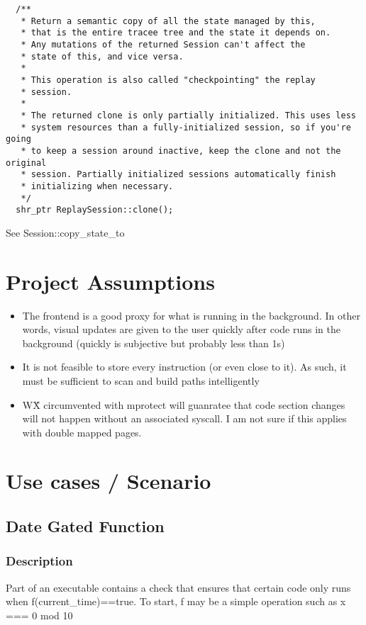 \begin{verbatim}
  /**
   * Return a semantic copy of all the state managed by this,
   * that is the entire tracee tree and the state it depends on.
   * Any mutations of the returned Session can't affect the
   * state of this, and vice versa.
   *
   * This operation is also called "checkpointing" the replay
   * session.
   *
   * The returned clone is only partially initialized. This uses less
   * system resources than a fully-initialized session, so if you're going
   * to keep a session around inactive, keep the clone and not the original
   * session. Partially initialized sessions automatically finish
   * initializing when necessary.
   */
  shr_ptr ReplaySession::clone();
\end{verbatim}

See Session::copy\_state\_to

\section{Project Assumptions}
\begin{itemize}
    \item The frontend is a good proxy for what is running in the background. In other words, visual updates are given to the user quickly after code runs in the background (quickly is subjective but probably less than 1s) 
    \item It is not feasible to store every instruction (or even close to it). As such, it must be sufficient to scan and build paths intelligently
    \item W\^X circumvented with mprotect will guanratee that code section changes will not happen without an associated syscall. 
        \subitem I am not sure if this applies with double mapped pages. 
\end{itemize}
\section{Use cases / Scenario}
\subsection{Date Gated Function}
\subsubsection{Description}
Part of an executable contains a check that ensures that certain code only runs when f(current\_time)==true. To start, f may be a simple operation such as x === 0 mod 10

